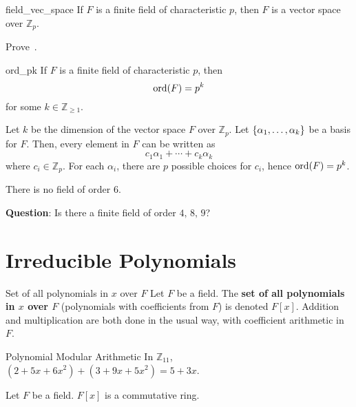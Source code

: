 \begin{Theorem}{}{field_vec_space}
    If $ F $ is a finite field of characteristic $ p $, then $ F $
    is a vector space over $ \mathbb{Z}_p $.
\end{Theorem}

\begin{Exercise}{}{}
    Prove~.
\end{Exercise}

\begin{Theorem}{}{ord_pk}
    If $ F $ is a finite field of characteristic $ p $, then
    \[ \operatorname{ord}(F)=p^k \]
    for some $ k\in\mathbb{Z}_{\geqslant 1} $.
\end{Theorem}

\begin{Proof}{}{}
    Let $ k $ be the dimension of the vector space $ F $ over $ \mathbb{Z}_p $.
    Let $ \{\alpha_1,\ldots ,\alpha_k\} $ be a basis for $ F $. Then, every element
    in $ F $ can be written as
    \[ c_1\alpha_1+\cdots+c_k\alpha_k \]
    where $ c_i\in\mathbb{Z}_p $. For each $ \alpha_i $, there are $ p $
    possible choices for $ c_i $, hence $ \operatorname{ord}(F)=p^k $.
\end{Proof}

\begin{Example}{}{}
    There is no field of order $ 6 $.
\end{Example}

\textbf{Question}: Is there a finite field of order $ 4,\,8,\,9 $?

\section{Irreducible Polynomials}

\begin{Definition}{Set of all polynomials in $ x $ over $ F $}{}
    Let $ F $ be a field. The \textbf{set of all polynomials in $ x $ over $ F $}
    (polynomials with coefficients from $ F $) is denoted $ F[x] $. Addition
    and multiplication are both done in the usual way, with coefficient arithmetic
    in $ F $.
\end{Definition}

\begin{Example}{Polynomial Modular Arithmetic}{}
    In $ \mathbb{Z}_{11} $, $ (2+5x+6x^2)+(3+9x+5x^2)=5+3x $.
\end{Example}

\begin{Theorem}{}{}
    Let $ F $ be a field. $ F[x] $ is a commutative ring.
\end{Theorem}

